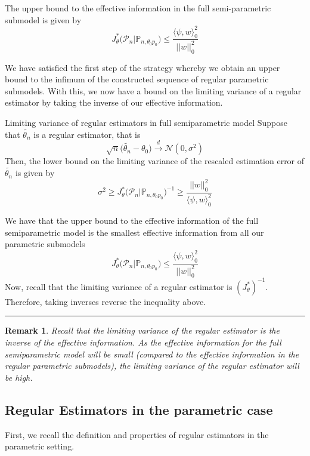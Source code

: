 \documentclass[twoside]{article}
\newtheorem{remark}[theorem]{Remark}
\newenvironment{proof}{{\bf Proof:}}{\hfill\rule{2mm}{2mm}}
\newcommand{\prob}{\mathbb{P}}
\begin{document}
The upper bound to the effective information in the full semi-parametric submodel is given by 
\begin{equation}
J_{\theta}^{*}\big(\mathcal{P}_{n}| \prob_{n, \theta_{0} p_0} \big) \leq \frac{\langle \psi, w \rangle_{0}^{2}}{||w||_{0}^{2}}
\end{equation}

We have satisfied the first step of the strategy whereby we obtain an upper bound to the infimum of the constructed sequence of regular parametric submodels. With this, we now have a bound on the limiting variance of a regular estimator by taking the inverse of our effective information.

\begin{proposition_exam}{Limiting variance of regular estimators in full semiparametric model}{} Suppose that $\tilde{\theta_{n}}$ is a regular estimator, that is 
$$
\sqrt{n}\big(\tilde{\theta_{n}} - \theta_0 \big) \xrightarrow{d} \mathcal{N}(0, \sigma^2)
$$
Then, the lower bound on the limiting variance of the rescaled estimation error of $\tilde{\theta_{n}}$ is given by 
$$
\sigma^2 \geq J_{\theta}^{*}\big(\mathcal{P}_{n}| \prob_{n, \theta_{0} p_0} \big)^{-1} \geq \frac{||w||_{0}^{2}}{\langle \psi, w \rangle_{0}^{2}}
$$
\end{proposition_exam}

\begin{proof} We have that the upper bound to the effective information of the full semiparametric model is the smallest effective information from all our parametric submodels 
$$
J_{\theta}^{*}\big(\mathcal{P}_{n}| \prob_{n, \theta_{0} p_0} \big) \leq \frac{\langle \psi, w \rangle_{0}^{2}}{||w||_{0}^{2}}
$$
Now, recall that the limiting variance of a regular estimator is $(J_{\theta}^{*})^{-1}$. Therefore, taking inverses reverse the inequality above.
\end{proof}

\begin{remark} Recall that the limiting variance of the regular estimator is the inverse of the effective information. As the effective information for the full semiparametric model will be small (compared to the effective information in the regular parametric submodels), the limiting variance of the regular estimator will be high.
\end{remark}

\subsection{Regular Estimators in the parametric case}
First, we recall the definition and properties of regular estimators in the parametric setting. 
\end{document}
